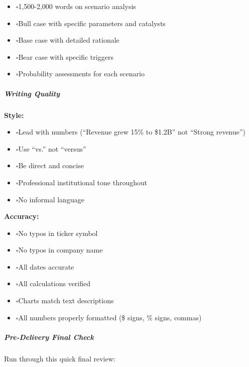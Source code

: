 \documentclass[11pt]{article}
\newcommand{\UncheckedBox}{$\square$}
\begin{document}
\begin{itemize}[leftmargin=*,itemsep=2pt,topsep=2pt]
\item {} \UncheckedBox 1,500-2,000 words on scenario analysis
\item {} \UncheckedBox Bull case with specific parameters and catalysts
\item {} \UncheckedBox Base case with detailed rationale
\item {} \UncheckedBox Bear case with specific triggers
\item {} \UncheckedBox Probability assessments for each scenario
\end{itemize}

\subparagraph{Writing Quality}\mbox{}\par

\textbf{Style:}

\begin{itemize}[leftmargin=*,itemsep=2pt,topsep=2pt]
\item {} \UncheckedBox Lead with numbers (``Revenue grew 15\% to \$1.2B'' not ``Strong revenue'')
\item {} \UncheckedBox Use ``vs.'' not ``versus''
\item {} \UncheckedBox Be direct and concise
\item {} \UncheckedBox Professional institutional tone throughout
\item {} \UncheckedBox No informal language
\end{itemize}

\textbf{Accuracy:}

\begin{itemize}[leftmargin=*,itemsep=2pt,topsep=2pt]
\item {} \UncheckedBox No typos in ticker symbol
\item {} \UncheckedBox No typos in company name
\item {} \UncheckedBox All dates accurate
\item {} \UncheckedBox All calculations verified
\item {} \UncheckedBox Charts match text descriptions
\item {} \UncheckedBox All numbers properly formatted (\$ signs, \% signs, commas)
\end{itemize}

\subparagraph{Pre-Delivery Final Check}\mbox{}\par

Run through this quick final review:
\end{document}
